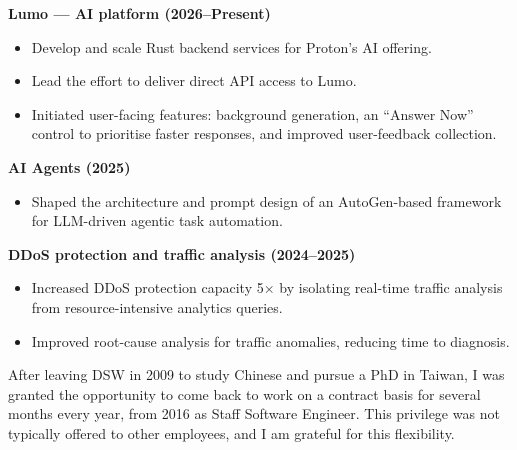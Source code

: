 \documentclass[10pt,a4paper]{../altacv}
\begin{document}
	\textbf{Lumo — AI platform (2026--Present)}
	\begin{itemize}
		\item Develop and scale Rust backend services for Proton's AI offering.
		\item Lead the effort to deliver direct API access to Lumo.
		\item Initiated user-facing features: background generation, an ``Answer Now'' control to prioritise faster responses, and improved user-feedback collection.
	\end{itemize}
	
	\textbf{AI Agents (2025)}
	\begin{itemize}
		\item Shaped the architecture and prompt design of an AutoGen-based framework for LLM-driven agentic task automation.
	\end{itemize}
	
	\textbf{DDoS protection and traffic analysis (2024--2025)}
	\begin{itemize}
		\item Increased DDoS protection capacity 5$\times$ by isolating real-time traffic analysis from resource-intensive analytics queries.
		\item Improved root-cause analysis for traffic anomalies, reducing time to diagnosis.
	\end{itemize}
	
	\medskip
	
	
	\medskip
	
	
	After leaving DSW in 2009 to study Chinese and pursue a PhD in Taiwan, I was granted the opportunity to come back to work on a contract basis for several months every year, from 2016 as Staff Software Engineer. This privilege was not typically offered to other employees, and I am grateful for this flexibility.
	
	\medskip
	
\end{document}

